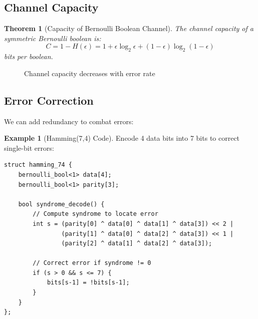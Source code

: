 \documentclass[11pt,twoside,openright]{book}
\theoremstyle{definition}
\newtheorem{example}[definition]{Example}
\theoremstyle{plain}
\newtheorem{theorem}[definition]{Theorem}
\theoremstyle{remark}
\begin{document}
\subsection{Channel Capacity}

\begin{theorem}[Capacity of Bernoulli Boolean Channel]
The channel capacity of a symmetric Bernoulli boolean is:
\begin{equation}
C = 1 - H(\epsilon) = 1 + \epsilon\log_2\epsilon + (1-\epsilon)\log_2(1-\epsilon)
\end{equation}
bits per boolean.
\end{theorem}

\begin{figure}[h]
\centering
{}
\caption{Channel capacity decreases with error rate}
\end{figure}

\subsection{Error Correction}

We can add redundancy to combat errors:

\begin{example}[Hamming(7,4) Code]
Encode 4 data bits into 7 bits to correct single-bit errors:
\begin{verbatim}
struct hamming_74 {
    bernoulli_bool<1> data[4];
    bernoulli_bool<1> parity[3];
    
    bool syndrome_decode() {
        // Compute syndrome to locate error
        int s = (parity[0] ^ data[0] ^ data[1] ^ data[3]) << 2 |
                (parity[1] ^ data[0] ^ data[2] ^ data[3]) << 1 |
                (parity[2] ^ data[1] ^ data[2] ^ data[3]);
        
        // Correct error if syndrome != 0
        if (s > 0 && s <= 7) {
            bits[s-1] = !bits[s-1];
        }
    }
};
\end{verbatim}
\end{example}
\end{document}
